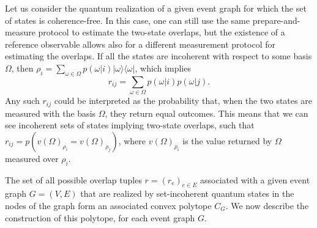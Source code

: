 \documentclass[letterpaper,onecolumn,12pt,accepted=2024-01-17]{article}
\begin{document}
{Let us consider the quantum realization of a given event graph for which the set of states is coherence-free. In this case, one can still use the same prepare-and-measure protocol to estimate the two-state overlaps, but the existence of a reference observable allows also for a different measurement protocol for estimating the overlaps. }If all the states are incoherent with respect to some basis $\Omega$, then $\rho_i = \sum_{\omega \in \Omega} p(\omega \vert i)\vert \omega \rangle \langle \omega \vert $, which implies \begin{equation}\label{eq: classical overlap}
    r_{ij} = \sum_{\omega \in \Omega} p(\omega \vert i)p(\omega \vert j).
\end{equation} Any such $r_{ij}$ could be interpreted as the probability that, when the two states are measured with the basis $\Omega$, they return equal outcomes. This means that we can see incoherent sets of states implying two-state overlaps, such that $r_{ij} = p(v(\Omega)_{\rho_i} = v(\Omega)_{\rho_j})$, where $v(\Omega)_{\rho_i}$ is the value returned by $\Omega$ measured over $\rho_i$. 

{ The set of all possible overlap tuples $r = (r_e)_{e \in E}$ associated with a given event graph $G=(V,E)$ that are realized by set-incoherent quantum states in the nodes of the graph form an associated convex polytope $C_G$. We now describe the construction of this polytope, for each event graph $G$.}
\end{document}
